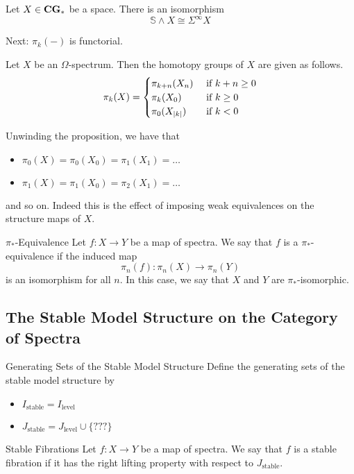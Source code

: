 \documentclass[a4paper]{article}
\begin{document}
\begin{prp}{}{} Let $X\in\bold{CG}_\ast$ be a space. There is an isomorphism $$\mathbb{S}\wedge X\cong\Sigma^\infty X$$
\end{prp}

Next: $\pi_k(-)$ is functorial. 

\begin{prp}{}{} Let $X$ be an $\Omega$-spectrum. Then the homotopy groups of $X$ are given as follows. $$\pi_k(X)=\begin{cases}
\pi_{k+n}(X_n) & \text{ if } k+n\geq 0\\
\pi_k(X_0) & \text{ if } k\geq 0\\
\pi_0(X_{\abs{k}}) & \text{ if } k<0
\end{cases}$$
\end{prp}

Unwinding the proposition, we have that 
\begin{itemize}
\item $\pi_0(X)=\pi_0(X_0)=\pi_1(X_1)=\dots$
\item $\pi_1(X)=\pi_1(X_0)=\pi_2(X_1)=\dots$
\end{itemize}
and so on. Indeed this is the effect of imposing weak equivalences on the structure maps of $X$. 

\begin{defn}{$\pi_\ast$-Equivalence}{} Let $f:X\to Y$ be a map of spectra. We say that $f$ is a $\pi_\ast$-equivalence if the induced map $$\pi_n(f):\pi_n(X)\to\pi_n(Y)$$ is an isomorphism for all $n$. In this case, we say that $X$ and $Y$ are $\pi_\ast$-isomorphic. 
\end{defn}

\subsection{The Stable Model Structure on the Category of Spectra}
\begin{defn}{Generating Sets of the Stable Model Structure}{} Define the generating sets of the stable model structure by
\begin{itemize}
\item $I_\text{stable}=I_\text{level}$
\item $J_\text{stable}=J_\text{level}\cup\{???\}$
\end{itemize}
\end{defn}

\begin{defn}{Stable Fibrations}{} Let $f:X\to Y$ be a map of spectra. We say that $f$ is a stable fibration if it has the right lifting property with respect to $J_\text{stable}$. 
\end{defn}
\end{document}
